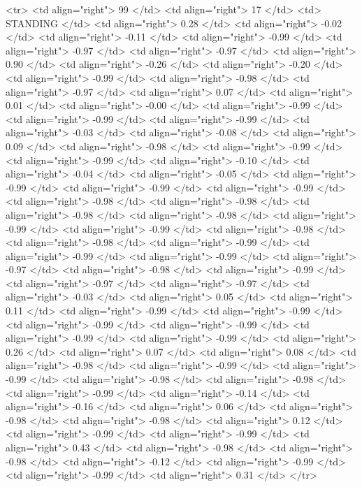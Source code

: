   <tr> <td align="right"> 99 </td> <td align="right">  17 </td> <td> STANDING </td> <td align="right"> 0.28 </td> <td align="right"> -0.02 </td> <td align="right"> -0.11 </td> <td align="right"> -0.99 </td> <td align="right"> -0.97 </td> <td align="right"> -0.97 </td> <td align="right"> 0.90 </td> <td align="right"> -0.26 </td> <td align="right"> -0.20 </td> <td align="right"> -0.99 </td> <td align="right"> -0.98 </td> <td align="right"> -0.97 </td> <td align="right"> 0.07 </td> <td align="right"> 0.01 </td> <td align="right"> -0.00 </td> <td align="right"> -0.99 </td> <td align="right"> -0.99 </td> <td align="right"> -0.99 </td> <td align="right"> -0.03 </td> <td align="right"> -0.08 </td> <td align="right"> 0.09 </td> <td align="right"> -0.98 </td> <td align="right"> -0.99 </td> <td align="right"> -0.99 </td> <td align="right"> -0.10 </td> <td align="right"> -0.04 </td> <td align="right"> -0.05 </td> <td align="right"> -0.99 </td> <td align="right"> -0.99 </td> <td align="right"> -0.99 </td> <td align="right"> -0.98 </td> <td align="right"> -0.98 </td> <td align="right"> -0.98 </td> <td align="right"> -0.98 </td> <td align="right"> -0.99 </td> <td align="right"> -0.99 </td> <td align="right"> -0.98 </td> <td align="right"> -0.98 </td> <td align="right"> -0.99 </td> <td align="right"> -0.99 </td> <td align="right"> -0.99 </td> <td align="right"> -0.97 </td> <td align="right"> -0.98 </td> <td align="right"> -0.99 </td> <td align="right"> -0.97 </td> <td align="right"> -0.97 </td> <td align="right"> -0.03 </td> <td align="right"> 0.05 </td> <td align="right"> 0.11 </td> <td align="right"> -0.99 </td> <td align="right"> -0.99 </td> <td align="right"> -0.99 </td> <td align="right"> -0.99 </td> <td align="right"> -0.99 </td> <td align="right"> -0.99 </td> <td align="right"> 0.26 </td> <td align="right"> 0.07 </td> <td align="right"> 0.08 </td> <td align="right"> -0.98 </td> <td align="right"> -0.99 </td> <td align="right"> -0.99 </td> <td align="right"> -0.98 </td> <td align="right"> -0.98 </td> <td align="right"> -0.99 </td> <td align="right"> -0.14 </td> <td align="right"> -0.16 </td> <td align="right"> 0.06 </td> <td align="right"> -0.98 </td> <td align="right"> -0.98 </td> <td align="right"> 0.12 </td> <td align="right"> -0.99 </td> <td align="right"> -0.99 </td> <td align="right"> 0.43 </td> <td align="right"> -0.98 </td> <td align="right"> -0.98 </td> <td align="right"> -0.12 </td> <td align="right"> -0.99 </td> <td align="right"> -0.99 </td> <td align="right"> 0.31 </td> </tr>
